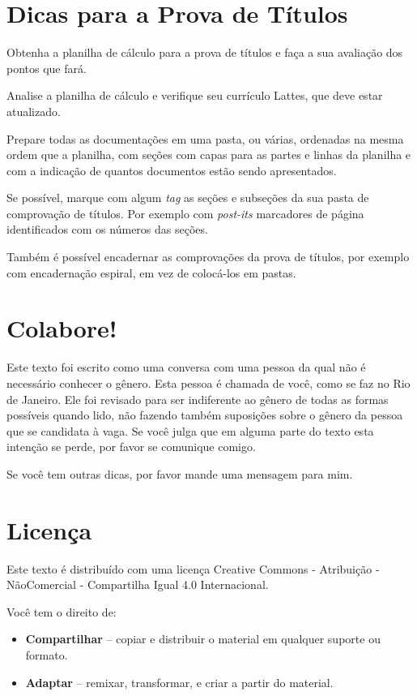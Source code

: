 \documentclass[12pt]{article}
\begin{document}
\section{Dicas para a Prova de Títulos}

Obtenha a planilha de cálculo para a prova de títulos e faça a sua avaliação dos pontos que fará.

Analise a planilha de cálculo e verifique seu currículo Lattes, que deve estar atualizado.

Prepare todas as documentações em uma pasta, ou várias, ordenadas na mesma ordem que a planilha, com seções com capas para as partes e linhas da planilha e com a indicação de quantos documentos estão sendo apresentados.

Se possível, marque com algum \textit{tag} as seções e subseções da sua pasta de comprovação de títulos.  Por exemplo com \textit{post-its} marcadores de página identificados com os números das seções.

Também é possível encadernar as comprovações da prova de títulos, por exemplo com encadernação espiral, em vez de colocá-los em pastas.

\section{Colabore!}

Este texto foi escrito como uma conversa com uma pessoa da qual não é necessário conhecer o gênero. Esta pessoa é chamada de você, como se faz no Rio de Janeiro. Ele foi revisado para ser indiferente ao gênero de todas as formas possíveis quando lido, não fazendo também suposições sobre o gênero da pessoa que se candidata à vaga. Se você julga que em alguma parte do texto esta intenção se perde, por favor se comunique comigo.

Se você tem outras dicas, por favor mande uma mensagem para mim.

\section{Licença}

Este texto é distribuído com uma licença Creative Commons - Atribuição - NãoComercial - Compartilha Igual 4.0 Internacional.


Você tem o direito de:
\begin{itemize}
\item \textbf{Compartilhar} -- copiar e distribuir o material em qualquer suporte ou formato.
\item \textbf{Adaptar} -- remixar, transformar, e criar a partir do material.
\end{itemize}
\end{document}
